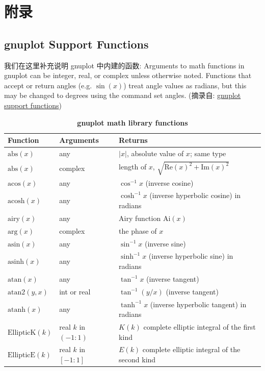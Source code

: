 \documentclass[
  hyper, lang=cn, 
  class=l3dox, 
]{../../zlatex/code/ztex}
\begin{document}
\clearpage
\section{附录}
\subsection{gnuplot Support Functions}
我们在这里补充说明 gnuplot 中内建的函数: Arguments to math functions in gnuplot can be integer, real, or 
complex unless otherwise noted. Functions that accept or return angles (e.g. $\sin(x)$) treat angle values as radians, 
but this may be changed to degrees using the command set angles.
(摘录自: \href{http://www.bersch.net/gnuplot-doc/expressions.html#expressions-functions-floor}{gnuplot support functions})

\begin{center}
  \begin{longtable}{lll}
    \caption{\textbf{gnuplot math library functions}}\\
    \toprule
    \textbf{Function} & \textbf{Arguments} & \textbf{Returns} \\
    \midrule
    \(\text{abs}(x)\) & any & $|x|$, absolute value of $x$; same type \\
    \(\text{abs}(x)\) & complex & length of $x$, $\sqrt{\text{Re}(x)^2 + \text{Im}(x)^2}$ \\
    \(\text{acos}(x)\) & any & $\cos^{-1} x$ (inverse cosine) \\
    \(\text{acosh}(x)\) & any & $\cosh^{-1} x$ (inverse hyperbolic cosine) in radians \\
    \(\text{airy}(x)\) & any & Airy function $\text{Ai}(x)$ \\
    \(\text{arg}(x)\) & complex & the phase of $x$ \\
    \(\text{asin}(x)\) & any & $\sin^{-1} x$ (inverse sine) \\
    \(\text{asinh}(x)\) & any & $\sinh^{-1} x$ (inverse hyperbolic sine) in radians \\
    \(\text{atan}(x)\) & any & $\tan^{-1} x$ (inverse tangent) \\
    \(\text{atan2}(y,x)\) & int or real & $\tan^{-1}(y/x)$ (inverse tangent) \\
    \(\text{atanh}(x)\) & any & $\tanh^{-1} x$ (inverse hyperbolic tangent) in radians \\
    \(\text{EllipticK}(k)\) & real  $k$ in $(-1:1)$ & $K(k)$ complete elliptic integral of the first kind \\
    \(\text{EllipticE}(k)\) & real  $k$ in $[-1:1]$ & $E(k)$ complete elliptic integral of the second kind \\

\end{longtable}
\end{center}
\end{document}
